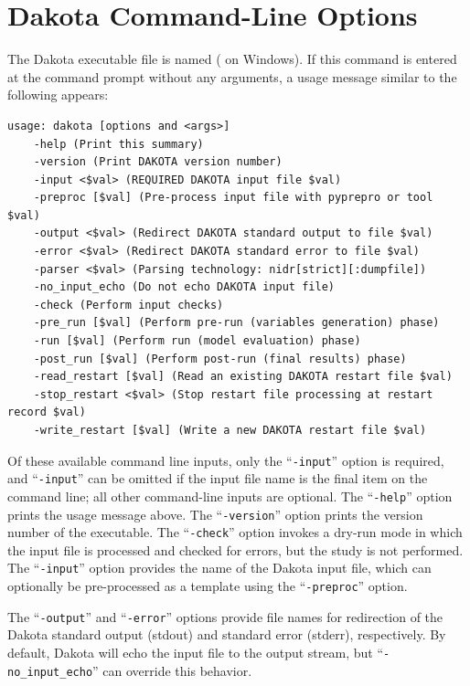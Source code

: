 \section{Dakota Command-Line Options}\label{tutorial:installation:running}

The Dakota executable file is named  ( on
Windows). If this command is entered at the command prompt without any
arguments, a usage message similar to the following appears:
\begin{small}
\begin{verbatim}
usage: dakota [options and <args>]
	-help (Print this summary)
	-version (Print DAKOTA version number)
	-input <$val> (REQUIRED DAKOTA input file $val)
	-preproc [$val] (Pre-process input file with pyprepro or tool $val)
	-output <$val> (Redirect DAKOTA standard output to file $val)
	-error <$val> (Redirect DAKOTA standard error to file $val)
	-parser <$val> (Parsing technology: nidr[strict][:dumpfile])
	-no_input_echo (Do not echo DAKOTA input file)
	-check (Perform input checks)
	-pre_run [$val] (Perform pre-run (variables generation) phase)
	-run [$val] (Perform run (model evaluation) phase)
	-post_run [$val] (Perform post-run (final results) phase)
	-read_restart [$val] (Read an existing DAKOTA restart file $val)
	-stop_restart <$val> (Stop restart file processing at restart record $val)
	-write_restart [$val] (Write a new DAKOTA restart file $val)
\end{verbatim}
\end{small}

Of these available command line inputs, only the ``\texttt{-input}''
option is required, and ``\texttt{-input}'' can be omitted if the
input file name is the final item on the command line; all other
command-line inputs are optional. The ``\texttt{-help}'' option prints
the usage message above. The ``\texttt{-version}'' option prints the
version number of the executable. The ``\texttt{-check}'' option
invokes a dry-run mode in which the input file is processed and
checked for errors, but the study is not performed. The
``\texttt{-input}'' option provides the name of the Dakota input file,
which can optionally be pre-processed as a template using the
``\texttt{-preproc}'' option.

The ``\texttt{-output}'' and ``\texttt{-error}'' options provide file
names for redirection of the Dakota standard output (stdout) and
standard error (stderr), respectively. By default, Dakota will echo
the input file to the output stream, but ``\texttt{-no\_input\_echo}''
can override this behavior.

